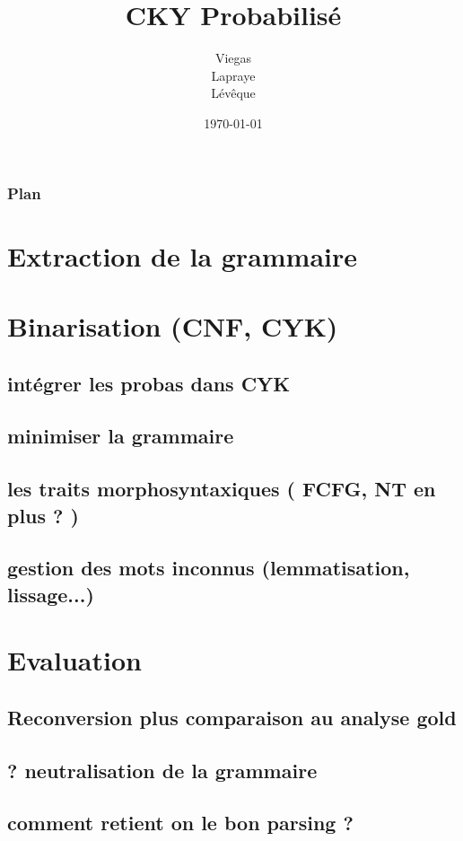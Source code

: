 \documentclass{beamer}
\begin{document}
\title{CKY Probabilisé}  %
\author{Viegas\\Lapraye\\Lévêque}

\date{\today}
\maketitle
{}


\begin{frame} %
\frametitle{Plan}
\section{Extraction de la grammaire}
\section{Binarisation (CNF, CYK)}
\subsection{intégrer les probas dans CYK}
\subsection{minimiser la grammaire}
\subsection{les traits morphosyntaxiques ( FCFG, NT en plus ? )}
\subsection{gestion des mots inconnus (lemmatisation, lissage...)}
\section{Evaluation}
\subsection{Reconversion plus comparaison au analyse gold}
\subsection{? neutralisation de la grammaire}
\subsection{comment retient on le bon parsing ?}
\end{frame}
\end{document}
